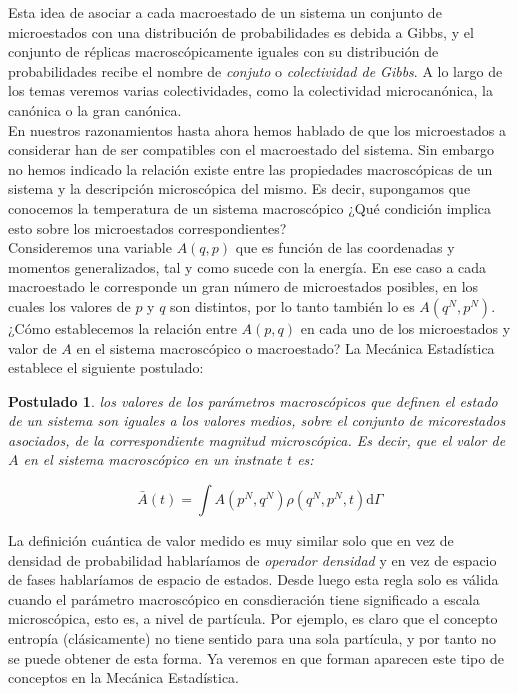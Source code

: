 \documentclass[12pt,a4paper]{article}
\numberwithin{equation}{section}
\numberwithin{figure}{section}
\newcommand{\D}{\mathrm{d}}
\newtheorem{postulado}{Postulado}
\theoremstyle{definition}
\begin{document}
Esta idea de asociar a cada macroestado de un sistema un conjunto de microestados con una distribución de probabilidades es debida a Gibbs, y el conjunto de réplicas macroscópicamente iguales con su distribución de probabilidades recibe el nombre de \textit{conjuto} o \textit{colectividad de Gibbs}. A lo largo de los temas veremos varias colectividades, como la colectividad microcanónica, la canónica o la gran canónica. \\

En nuestros razonamientos hasta ahora hemos hablado de que los microestados a considerar han de ser compatibles con el macroestado del sistema. Sin embargo no hemos indicado la relación existe entre las propiedades macroscópicas de un sistema y la descripción microscópica del mismo. Es decir, supongamos que conocemos la temperatura de un sistema macroscópico ¿Qué condición implica esto sobre los microestados correspondientes? \\

Consideremos una variable $A(q,p)$ que es función de las coordenadas y momentos generalizados, tal y como sucede con la energía. En ese caso a cada macroestado le corresponde un gran número de microestados posibles, en los cuales los valores de $p$ y $q$ son distintos, por lo tanto también lo es $A(q^N,p^N)$. ¿Cómo establecemos la relación entre $A(p,q)$ en cada uno de los microestados y valor de $A$ en el sistema macroscópico o macroestado? La Mecánica Estadística establece el siguiente postulado:



\begin{postulado}
los valores de los parámetros macroscópicos que definen el estado de un sistema son iguales a los valores medios, sobre el conjunto de micorestados asociados, de la correspondiente magnitud microscópica. Es decir, que el valor de $A$ en el sistema macroscópico en un instnate $t$ es:

\begin{equation}
\bar{A} (t) = \int A(p^N,q^N) \rho (q^N,p^N,t) \D \Gamma
\end{equation}
\end{postulado}

La definición cuántica de valor medido es muy similar solo que en vez de densidad de probabilidad hablaríamos de \textit{operador densidad} y en vez de espacio de fases hablaríamos de espacio de estados. Desde luego esta regla solo es válida cuando el parámetro macroscópico en consdieración tiene significado a escala microscópica, esto es, a nivel de partícula. Por ejemplo, es claro que el concepto entropía (clásicamente) no tiene sentido para una sola partícula, y por tanto no se puede obtener de esta forma. Ya veremos en que forman aparecen este tipo de conceptos en la Mecánica Estadística.
\end{document}
